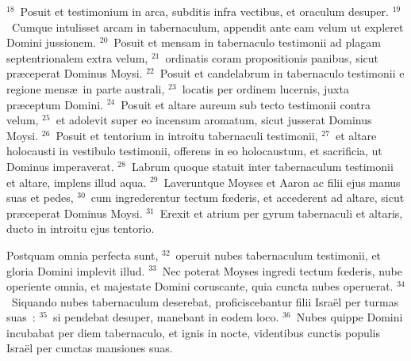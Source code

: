 ${}^{18}$~Posuit et testimonium in arca, subditis infra vectibus, et oraculum desuper.
${}^{19}$~Cumque intulisset arcam in tabernaculum, appendit ante eam velum ut expleret Domini jussionem.
${}^{20}$~Posuit et mensam in tabernaculo testimonii ad plagam septentrionalem extra velum,
${}^{21}$~ordinatis coram propositionis panibus, sicut pr\ae ceperat Dominus Moysi.
${}^{22}$~Posuit et candelabrum in tabernaculo testimonii e regione mens\ae\ in parte australi,
${}^{23}$~locatis per ordinem lucernis, juxta pr\ae ceptum Domini.
${}^{24}$~Posuit et altare aureum sub tecto testimonii contra velum,
${}^{25}$~et adolevit super eo incensum aromatum, sicut jusserat Dominus Moysi.
${}^{26}$~Posuit et tentorium in introitu tabernaculi testimonii,
${}^{27}$~et altare holocausti in vestibulo testimonii, offerens in eo holocaustum, et sacrificia, ut Dominus imperaverat.
${}^{28}$~Labrum quoque statuit inter tabernaculum testimonii et altare, implens illud aqua.
${}^{29}$~Laveruntque Moyses et Aaron ac filii ejus manus suas et pedes,
${}^{30}$~cum ingrederentur tectum fœderis, et accederent ad altare, sicut pr\ae ceperat Dominus Moysi.
${}^{31}$~Erexit et atrium per gyrum tabernaculi et altaris, ducto in introitu ejus tentorio.

 Postquam omnia perfecta sunt,
${}^{32}$~operuit nubes tabernaculum testimonii, et gloria Domini implevit illud.
${}^{33}$~Nec poterat Moyses ingredi tectum fœderis, nube operiente omnia, et majestate Domini coruscante, quia cuncta nubes operuerat.
${}^{34}$~Siquando nubes tabernaculum deserebat, proficiscebantur filii Isra\"el per turmas suas~:
${}^{35}$~si pendebat desuper, manebant in eodem loco.
${}^{36}$~Nubes quippe Domini incubabat per diem tabernaculo, et ignis in nocte, videntibus cunctis populis Isra\"el per cunctas mansiones suas.
